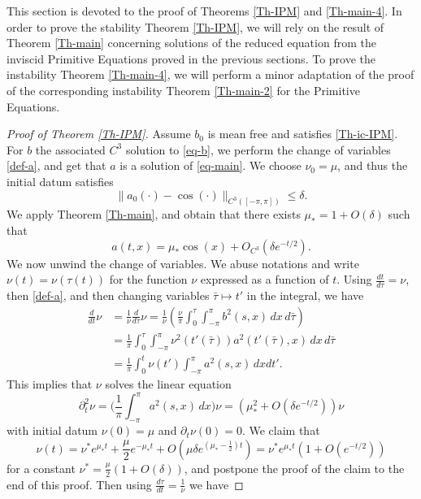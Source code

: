 \documentclass[12pt]{amsart}
\numberwithin{equation}{section}
\numberwithin{equation}{section}
\begin{document}
This section is devoted to the proof of Theorems \ref{Th-IPM} and \ref{Th-main-4}. In order to prove the stability Theorem \ref{Th-IPM}, we will rely on the result of Theorem \ref{Th-main} concerning solutions of the reduced equation from the inviscid Primitive Equations proved in the previous sections. To prove the instability Theorem \ref{Th-main-4}, we will perform a minor adaptation of the proof of the corresponding instability Theorem \ref{Th-main-2} for the Primitive Equations.


\begin{proof}[Proof of Theorem \ref{Th-IPM}]

Assume $b_0$ is mean free and satisfies \eqref{Th-ic-IPM}. For $b$ the associated $C^3$ solution to \eqref{eq-b}, we perform the change of variables \eqref{def-a}, and get that $a$ is a solution of \eqref{eq-main}. We choose $\nu_0=\mu$, and thus the initial datum satisfies
$$
 \|a_0(\cdot) - \cos ( \cdot)\|_{C^3([-\pi,\pi])} \leq \delta.
$$
We apply Theorem \ref{Th-main}, and obtain that there exists $\mu_*=1+O(\delta)$ such that
\begin{equation} \label{asymptotic-a}
a(t,x)=\mu_* \cos(x)+O_{C^3}(\delta e^{- t/2}).
\end{equation}
We now unwind the change of variables. We abuse notations and write $\nu(t)=\nu(\tau (t))$ for the function $\nu$ expressed as a function of $t$. Using $\frac{dt}{d\tau}=\nu$, then \eqref{def-a}, and then changing variables $\bar \tau\mapsto t'$ in the integral, we have
\begin{align*}
\frac{d}{dt}\nu &= \frac{1}{\nu}  \frac{d}{d\tau}\nu = \frac{1}{\nu}\left(\frac{\nu}{\pi}\int_0^{\tau} \int_{-\pi}^{\pi}b^2(s,  x)\,dx\,d\bar\tau\right) \\
&=  \frac{1}{\pi}\int_0^{\tau} \int_{-\pi}^{\pi} \nu^2(t'(\bar \tau))a^2(t'(\bar \tau),  x)\,dx\,d\bar\tau \\
& = \frac{1}{\pi}\int_0^{t} \nu(t') \int_{-\pi}^{\pi}a^2(s,  x)\,dx dt' .
\end{align*}
This implies that $\nu$ solves the linear equation
$$
\partial_t^2 \nu = \Big(  \frac{1}{\pi} \int_{-\pi}^{\pi}a^2(s,  x)\,dx \Big)\nu = (\mu_{*}^2+O(\delta e^{-t/2}))\nu
$$
with initial datum $\nu(0)=\mu$ and $\partial_t \nu(0)=0$. We claim that
\begin{equation} \label{asymptotic-nu}
\nu(t)= \nu^* e^{\mu_* t}+\frac{\mu}{2} e^{-\mu_* t}+O(\mu \delta e^{(\mu_*-\frac 12)t}) = \nu^* e^{\mu_* t} (1+O(e^{-t/2}))
\end{equation}
for a constant $\nu^*=\frac{\mu}{2}(1+O(\delta))$, and postpone the proof of the claim to the end of this proof. Then using $\frac{d\tau}{dt}=\frac{1}{\nu}$ we have

\end{proof}
\end{document}
